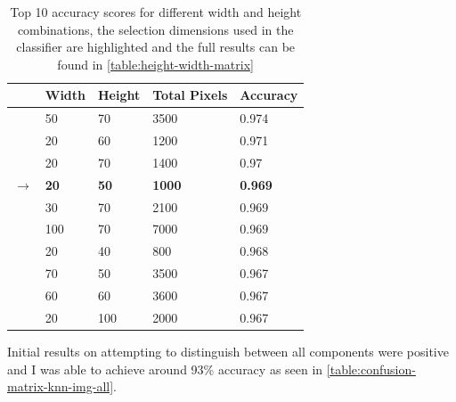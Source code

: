 \begin{table}[H]

    \begin{tabularx}{\textwidth}{ r X X X X }
    \toprule
    & Width & Height & Total Pixels & Accuracy \\
    \midrule
    & 50  & 70  & 3500 & 0.974 \\
    & 20  & 60  & 1200 & 0.971 \\
    & 20  & 70  & 1400 & 0.97 \\
    $\rightarrow$ & \textbf{20}  & \textbf{50}  & \textbf{1000} & \textbf{0.969} \\
    & 30  & 70  & 2100 & 0.969 \\
    & 100 & 70  & 7000 & 0.969 \\
    & 20  & 40  & 800  & 0.968 \\
    & 70  & 50  & 3500 & 0.967 \\
    & 60  & 60  & 3600 & 0.967 \\
    & 20  & 100 & 2000 & 0.967 \\
    \bottomrule
    \end{tabularx}

    \label{table:knn-width-height-top}
    \caption{Top 10 accuracy scores for different width and height combinations, the selection dimensions used in the classifier are highlighted and the full results can be found in \cref{table:height-width-matrix}}
\end{table}

Initial results on attempting to distinguish between all components were positive and I was able to achieve around 93\% accuracy as seen in \cref{table:confusion-matrix-knn-img-all}.


